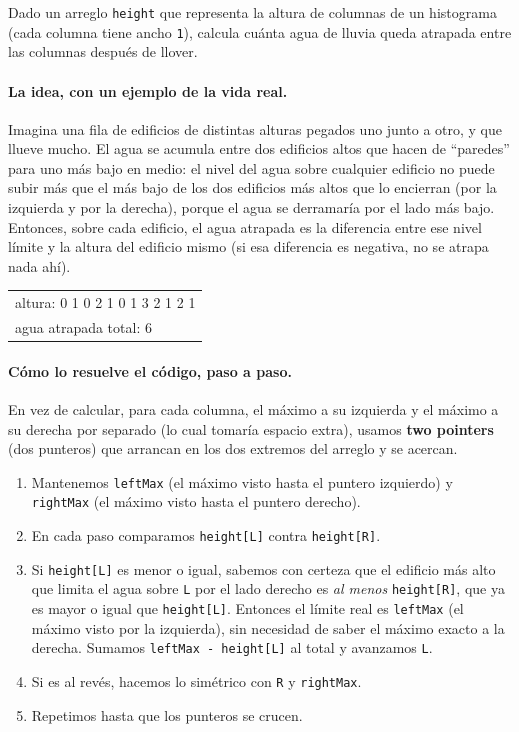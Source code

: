
Dado un arreglo \texttt{height} que representa la altura de columnas de un
histograma (cada columna tiene ancho \texttt{1}), calcula cuánta agua de
lluvia queda atrapada entre las columnas después de llover.

\paragraph{La idea, con un ejemplo de la vida real.} Imagina una fila de
edificios de distintas alturas pegados uno junto a otro, y que llueve
mucho. El agua se acumula entre dos edificios altos que hacen de ``paredes''
para uno más bajo en medio: el nivel del agua sobre cualquier edificio no
puede subir más que el más bajo de los dos edificios más altos que lo
encierran (por la izquierda y por la derecha), porque el agua se derramaría
por el lado más bajo. Entonces, sobre cada edificio, el agua atrapada es la
diferencia entre ese nivel límite y la altura del edificio mismo (si esa
diferencia es negativa, no se atrapa nada ahí).

\begin{center}
\ttfamily
\begin{tabular}{l}
altura: 0 1 0 2 1 0 1 3 2 1 2 1\\
agua atrapada total: 6\\
\end{tabular}
\end{center}

\paragraph{Cómo lo resuelve el código, paso a paso.} En vez de calcular, para
cada columna, el máximo a su izquierda y el máximo a su derecha por
separado (lo cual tomaría espacio extra), usamos \textbf{two pointers} (dos
punteros) que arrancan en los dos extremos del arreglo y se acercan.
\begin{enumerate}
  \item Mantenemos \texttt{leftMax} (el máximo visto hasta el puntero
        izquierdo) y \texttt{rightMax} (el máximo visto hasta el puntero
        derecho).
  \item En cada paso comparamos \texttt{height[L]} contra
        \texttt{height[R]}.
  \item Si \texttt{height[L]} es menor o igual, sabemos con certeza que el
        edificio más alto que limita el agua sobre \texttt{L} por el lado
        derecho es \emph{al menos} \texttt{height[R]}, que ya es mayor o
        igual que \texttt{height[L]}. Entonces el límite real es
        \texttt{leftMax} (el máximo visto por la izquierda), sin necesidad
        de saber el máximo exacto a la derecha. Sumamos
        \texttt{leftMax - height[L]} al total y avanzamos \texttt{L}.
  \item Si es al revés, hacemos lo simétrico con \texttt{R} y
        \texttt{rightMax}.
  \item Repetimos hasta que los punteros se crucen.
\end{enumerate}

